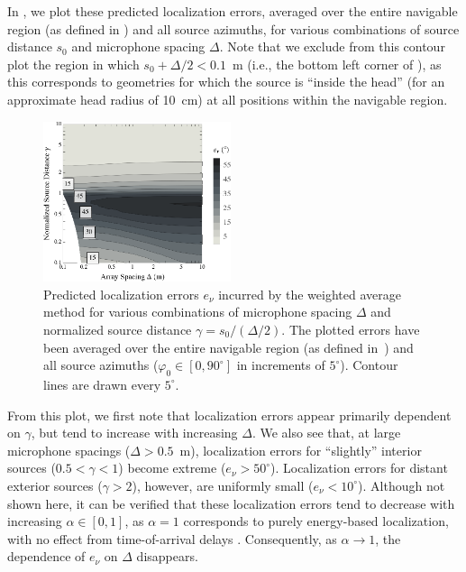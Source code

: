 In , we plot these predicted localization errors, averaged over the entire navigable region (as defined in ) and all source azimuths, for various combinations of source distance $s_0$ and microphone spacing $\Delta$.
Note that we exclude from this contour plot the region in which $s_0 + \Delta / 2 < 0.1$~m
(i.e., the bottom left corner of ), as this corresponds to geometries for which the source is
``inside the head'' (for an approximate head radius of 10~cm) at all positions within the navigable region.

\begin{figure}[t]
\centering
  \includegraphics[width = 0.49\textwidth]{08_proposed_method/figures/stitt2016_a60_contour_xf.eps}
  \caption[Localization contour plot for the weighted average method.]{
  Predicted localization errors $e_\nu$ incurred by the weighted average method
  for various combinations of microphone spacing $\Delta$ and normalized source distance $\gamma = s_0 / (\Delta / 2)$.
  The plotted errors have been averaged over the entire navigable region (as defined in~)
  and all source azimuths ($\varphi_0 \in [0,90^\circ]$ in increments of $5^\circ$).
  Contour lines are drawn every $5^\circ$.}
  \label{fig:08_Proposed_Method:XF_PrecedenceErrors}
\end{figure}

From this plot, we first note that localization errors appear primarily dependent on $\gamma$, but tend to increase with increasing $\Delta$.
We also see that, at large microphone spacings ($\Delta > 0.5$~m), localization errors for ``slightly'' interior sources ($0.5 < \gamma < 1$) become extreme ($e_\nu > 50^\circ$).
Localization errors for distant exterior sources ($\gamma > 2$), however, are uniformly small ($e_\nu < 10^\circ$).
Although not shown here, it can be verified that these localization errors tend to decrease with increasing $\alpha \in [0,1]$,
as $\alpha = 1$ corresponds to purely energy-based localization, with no effect from time-of-arrival delays \citep{Stitt2016}.
Consequently, as $\alpha \to 1$, the dependence of $e_\nu$ on $\Delta$ disappears.